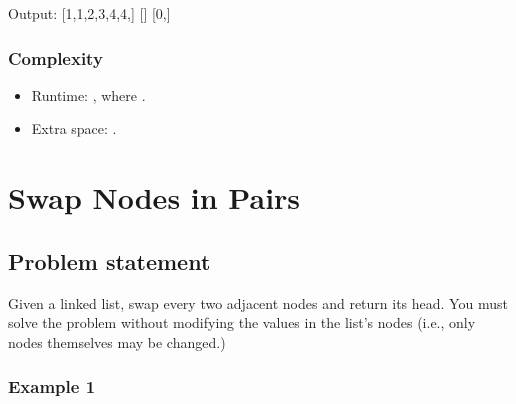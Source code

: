 \documentclass[letterpaper,12pt,english]{book}
\begin{document}
\begin{sphinxVerbatim}[commandchars=\\\{\}]
Output:
[1,1,2,3,4,4,]
[]
[0,]
\end{sphinxVerbatim}


\subsubsection{Complexity}
\label{\detokenize{Linked_List/02_LL_21_Merge_Two_Sorted_Lists:complexity}}\begin{itemize}
\item {} 
\sphinxAtStartPar
Runtime: , where .

\item {} 
\sphinxAtStartPar
Extra space: .

\end{itemize}

\sphinxstepscope


\section{Swap Nodes in Pairs}
\label{\detokenize{Linked_List/02_LL_24_Swap_Nodes_in_Pairs:swap-nodes-in-pairs}}\label{\detokenize{Linked_List/02_LL_24_Swap_Nodes_in_Pairs::doc}}

\subsection{Problem statement\sphinxfootnotemark[21]}
\label{\detokenize{Linked_List/02_LL_24_Swap_Nodes_in_Pairs:problem-statement}}%
\begin{footnotetext}[21]\sphinxAtStartFootnote
{}
%
\end{footnotetext}\ignorespaces 
\sphinxAtStartPar
Given a linked list, swap every two adjacent nodes and return its head. You must solve the problem without modifying the values in the list’s nodes (i.e., only nodes themselves may be changed.)


\subsubsection{Example 1}
\label{\detokenize{Linked_List/02_LL_24_Swap_Nodes_in_Pairs:example-1}}
\sphinxAtStartPar
{}
\end{document}
